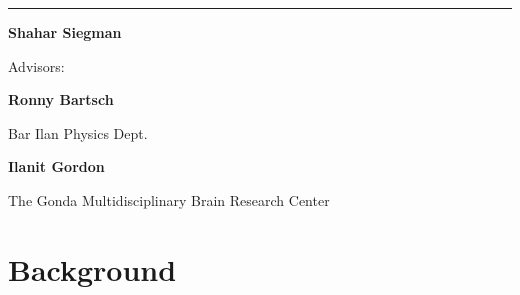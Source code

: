 \documentclass[a4paper, 11pt]{report}      %
\begin{document}
\begin{titlepage}
{	\vspace{0.01\textheight} %
	\rule{0.3\textwidth}{0.4pt} %
	
	\vspace{10pt} %
	
	
	{\Large \bf Shahar Siegman}\par
	
	}%
	
	
	\vspace{0.05\textheight} %

	{\Large  Advisors: \par 
	\bf Ronny Bartsch \par}
	{\large Bar Ilan Physics Dept.\par} 
	{\Large \bf Ilanit Gordon \par} 
	{\large The Gonda Multidisciplinary Brain Research Center}  %
	
	
	

	
	
	
	
	
\end{titlepage}



{\renewcommand{\baselinestretch}{1.3}\selectfont
\tableofcontents
}

\pagebreak

\section{Background}
\end{document}
